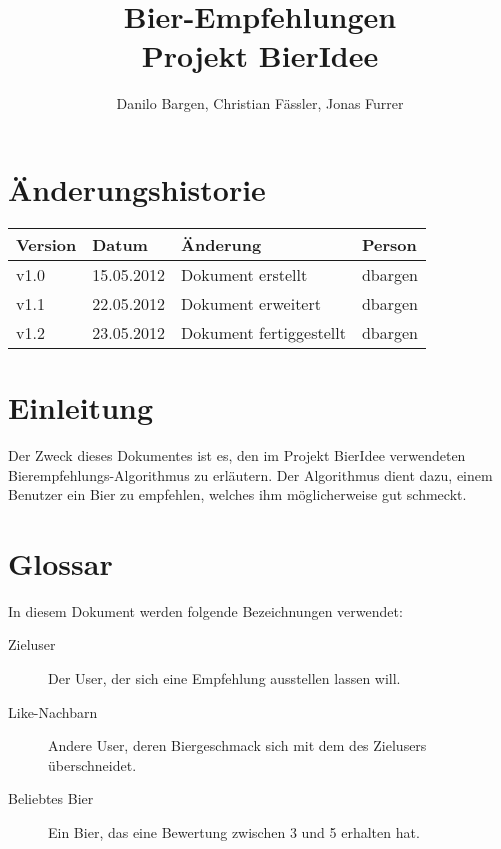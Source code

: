 \documentclass[10pt,a4paper]{scrartcl}
\author{Danilo Bargen, Christian Fässler, Jonas Furrer}
\title{Bier-Empfehlungen\\ Projekt BierIdee}
\begin{document}
\begin{titlepage}
	\maketitle
	\vspace{120mm}
	\thispagestyle{empty} %
\end{titlepage}

\tableofcontents
\newpage

\section*{Änderungshistorie}
\begin{tabular}{p{}p{}p{}p{}}
\toprule
\textbf{Version} & \textbf{Datum} & \textbf{Änderung} & \textbf{Person} \\  
\midrule
v1.0 & 15.05.2012 & Dokument erstellt & dbargen \\  
\hline
v1.1 & 22.05.2012 & Dokument erweitert & dbargen \\  
\hline
v1.2 & 23.05.2012 & Dokument fertiggestellt & dbargen \\  
\bottomrule
\end{tabular} 
\newpage


\section{Einleitung}

Der Zweck dieses Dokumentes ist es, den im Projekt BierIdee verwendeten Bierempfehlungs-Algorithmus
zu erläutern. Der Algorithmus dient dazu, einem Benutzer ein Bier zu empfehlen, welches ihm
möglicherweise gut schmeckt.


\section{Glossar}

In diesem Dokument werden folgende Bezeichnungen verwendet:

\begin{description}
	\item[Zieluser] Der User, der sich eine Empfehlung ausstellen lassen will.
	\item[Like-Nachbarn] Andere User, deren Biergeschmack sich mit dem des Zielusers überschneidet.
	\item[Beliebtes Bier] Ein Bier, das eine Bewertung zwischen 3 und 5 erhalten hat.
\end{description}
\end{document}
